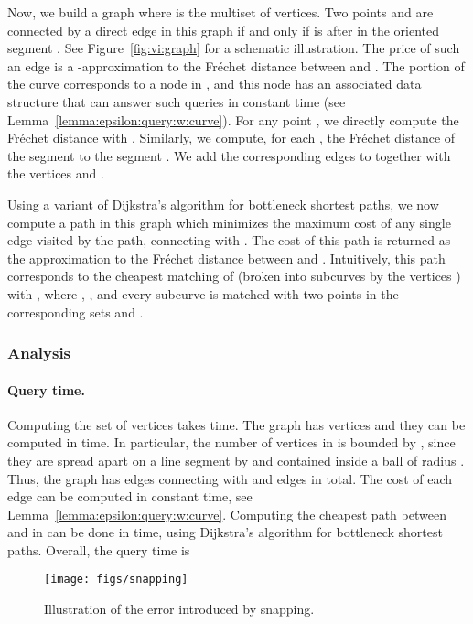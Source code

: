 \documentclass[12pt]{article}
\newcommand{\lemref}[1]{Lemma~\ref{lemma:#1}}
\newcommand{\figlab}[1]{\label{fig:#1}}
\newcommand{\figref}[1]{Figure~\ref{fig:#1}}
\newcommand{\Frechet}{Fr\'{e}c{h}e{}t\xspace}\providecommand{\Arr}{\mathop{\mathrm{\EuScript{A}}}}
\numberwithin{figure}{section}
\numberwithin{equation}{section}
\begin{document}
Now, we build a graph  where  is the multiset
of vertices. Two points  and  are connected
by a direct edge in this graph if and only if  is after  in the
oriented segment . See \figref{vi:graph} for a schematic
illustration. The price of such an edge  is a
-approximation to the \Frechet distance between
 and .  The portion
 of the curve corresponds to a node in
, and this node has an associated data structure that can
answer such queries in constant time (see
\lemref{epsilon:query:w:curve}).  For any point , we
directly compute the \Frechet distance  with . Similarly, we compute, for each , the \Frechet
distance of the segment  to the segment . We add
the corresponding edges to  together with the vertices 
and .

Using a variant of Dijkstra's algorithm for bottleneck shortest paths,
we now compute a path in this graph which minimizes the maximum cost
of any single edge visited by the path, connecting  with
. The cost of this path is returned as the approximation to the
\Frechet distance between  and .
Intuitively, this path corresponds to the cheapest matching of
 (broken into subcurves by the vertices ) with , where
, , and every subcurve
 is matched with two points in the
corresponding sets  and .


\subsubsection{Analysis}

\paragraph{Query time.}
Computing the set of vertices  takes  time.  The graph  has  vertices and they
can be computed in  time. In particular, the number of
vertices in  is bounded by , since they are spread
apart on a line segment by  and contained inside a
ball of radius . Thus, the graph has 
edges connecting  with  and  edges in
total. The cost of each edge can be computed in constant time, see
\lemref{epsilon:query:w:curve}.  Computing the cheapest path between
 and  in  can be done in  time, using Dijkstra's
algorithm for bottleneck shortest paths. Overall, the query time is


\begin{figure}\centering
    \texttt{[image: figs/snapping]}
    \caption{Illustration of the error introduced by snapping. }
    \figlab{snapping-error}
\end{figure}
\end{document}
